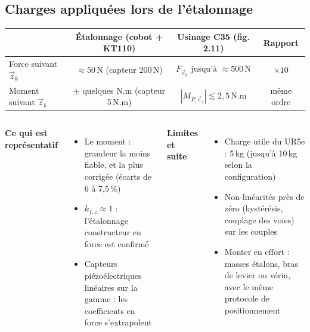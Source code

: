 \subsection*{Charges appliquées lors de l'étalonnage}
\begin{frame}

    \vspace{1mm}
    \begin{center}
        \small
        \begin{tabular}{lccc}
            \hline
                                    & Étalonnage (cobot + KT110) & Usinage C35 (fig. 2.11) & Rapport \\
            \hline
            Force suivant $\vec{z}_k$ & $\approx 50$\,N (capteur 200\,N) & $F_{\vec{e}_\theta}$ jusqu'à $\approx 500$\,N & $\times 10$ \\
            Moment suivant $\vec{z}_k$ & $\pm$ quelques N.m (capteur 5\,N.m) & $|M_{P,\vec{e}_z}| \lesssim 2{,}5$\,N.m & \alert{même ordre} \\
            \hline
        \end{tabular}
    \end{center}

    \begin{columns}[t]
        \textbf{Ce qui est représentatif}
        \begin{itemize}
            \item Le \alert{moment} : grandeur la moins fiable, et la plus corrigée (écarts de 6 à 7,5\,\%)
            \item $k_{f,z} \approx 1$ : l'étalonnage constructeur en force est confirmé
            \item Capteurs piézoélectriques linéaires sur la gamme : les coefficients en force s'extrapolent
        \end{itemize}
        \textbf{Limites et suite}
        \begin{itemize}
            \item Charge utile du UR5e : 5\,kg (jusqu'à 10\,kg selon la configuration)
            \item Non-linéarités près de zéro (hystérésis, couplage des voies) sur les couples
            \item Monter en effort : masses étalons, bras de levier ou vérin, avec le même protocole de positionnement
        \end{itemize}
    \end{columns}
\end{frame}

